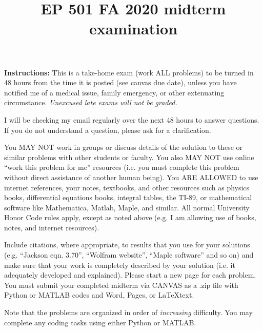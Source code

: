 \documentclass{article}
\begin{document}
\title{EP 501 FA 2020 midterm examination}

\maketitle

\textbf{Instructions:  }This is a take-home exam (work ALL problems) to be turned in 48 hours from the time it is posted (see canvas due date), unless you have notified me of a medical issue, family emergency, or other extenuating circumstance.  \emph{Unexcused late exams will not be graded.}

I will be checking my email regularly over the next 48 hours to answer questions.  If you do not understand a question, please ask for a clarification.  

You MAY NOT work in groups or discuss details of the solution to these or similar problems with other students or faculty.  You also MAY NOT use online ``work this problem for me'' resources (i.e. you must complete this problem without direct assistance of another human being).  You ARE ALLOWED to use internet references, your notes, textbooks, and other resources such as physics books, differential equations books, integral tables, the TI-89, or mathematical software like Mathematica, Matlab, Maple, and similar.  All normal University Honor Code rules apply, except as noted above (e.g. I am allowing use of books, notes, and internet resources).  

Include citations, where appropriate, to results that you use for your solutions (e.g. ``Jackson eqn. 3.70'', ``Wolfram website'', ``Maple software'' and so on) and make sure that your work is completely described by your solution (i.e. it adequately developed and explained).   Please start a new page for each problem.  You must submit your completed midterm via CANVAS as a .zip file with Python or MATLAB codes and Word, Pages, or \LaTeX text.



Note that the problems are organized in order of \emph{increasing} difficulty.  You may complete any coding tasks using either Python or MATLAB.
\end{document}
